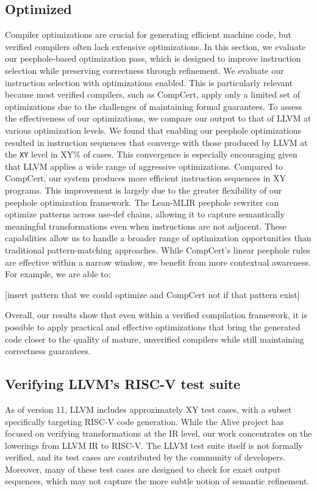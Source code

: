 \subsection{Optimized}
Compiler optimizations are crucial for generating efficient machine code, but verified compilers often lack extensive optimizations. In this section, we evaluate our peephole-based optimization pass, which is designed to improve instruction selection while preserving correctness through refinement.
We evaluate our instruction selection with optimizations enabled. This is particularly relevant because most verified compilers, such as CompCert, apply only a limited set of optimizations due to the challenges of maintaining formal guarantees. 
To assess the effectiveness of our optimizations, we compare our output to that of LLVM at various optimization levels. We found that enabling our peephole optimizations resulted in instruction sequences that converge with those produced by LLVM at the \texttt{XY} level in XY\% of cases. This convergence is especially encouraging given that LLVM applies a wide range of aggressive optimizations.
Compared to CompCert, our system produces more efficient instruction sequences in XY programs. This improvement is largely due to the greater flexibility of our peephole optimization framework. The Lean-MLIR peephole rewriter can optimize patterns across use-def chains, allowing it to capture semantically meaningful transformations even when instructions are not adjacent. These capabilities allow us to handle a broader range of optimization opportunities than traditional pattern-matching approaches. While CompCert’s linear peephole rules are effective within a narrow window, we benefit from more contextual awareness. For example, we are able to:

[insert pattern that we could optimize and CompCert not if that pattern exist]

Overall, our results show that even within a verified compilation framework, it is possible to apply practical and effective optimizations that bring the generated code closer to the quality of mature, unverified compilers while still maintaining correctness guarantees.


\subsection {Verifying LLVM's RISC-V test suite}
As of version 11, LLVM includes approximately XY test cases, with a subset specifically targeting RISC-V code generation. While the Alive project has focused on verifying transformations at the IR level, our work concentrates on the lowerings from LLVM IR to RISC-V. The LLVM test suite itself is not formally verified, and its test cases are contributed by the community of developers. Moreover, many of these test cases are designed to check for exact output sequences, which may not capture the more subtle notion of semantic refinement.


